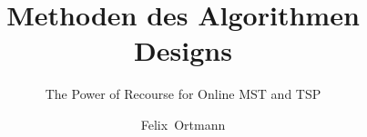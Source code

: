 \title[MDAE: Recourse -- Online MST and TSP]{Methoden des Algorithmen Designs}
\subtitle{The Power of Recourse for Online MST and TSP}
\author{Felix~Ortmann}
\beamertemplatenavigationsymbolsempty
